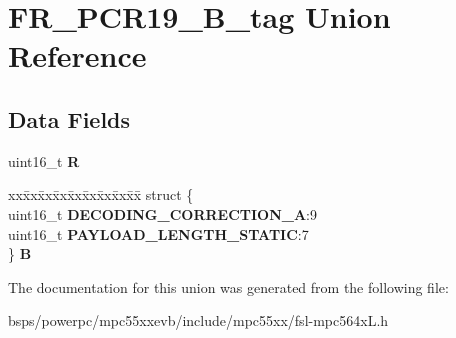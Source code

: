 \hypertarget{unionFR__PCR19__16B__tag}{}\section{F\+R\+\_\+\+P\+C\+R19\+\_\+B\+\_\+tag Union Reference}
\label{unionFR__PCR19__16B__tag}
\subsection*{Data Fields}
\begin{DoxyCompactItemize}
\item 
\mbox{\label{unionFR__PCR19__16B__tag_a447cf898f9bb3cf936644d899a10265f}} 
uint16\+\_\+t {\bfseries R}
\item 
\mbox{\label{unionFR__PCR19__16B__tag_aff3c657334c11d720d9ebff85a4b38aa}} 
\begin{tabbing}
xx\=xx\=xx\=xx\=xx\=xx\=xx\=xx\=xx\=\kill
struct \{\\
\>uint16\_t {\bfseries DECODING\_CORRECTION\_A}:9\\
\>uint16\_t {\bfseries PAYLOAD\_LENGTH\_STATIC}:7\\
\} {\bfseries B}\\

\end{tabbing}\end{DoxyCompactItemize}


The documentation for this union was generated from the following file\+:\begin{DoxyCompactItemize}
\item 
bsps/powerpc/mpc55xxevb/include/mpc55xx/fsl-\/mpc564x\+L.\+h\end{DoxyCompactItemize}
